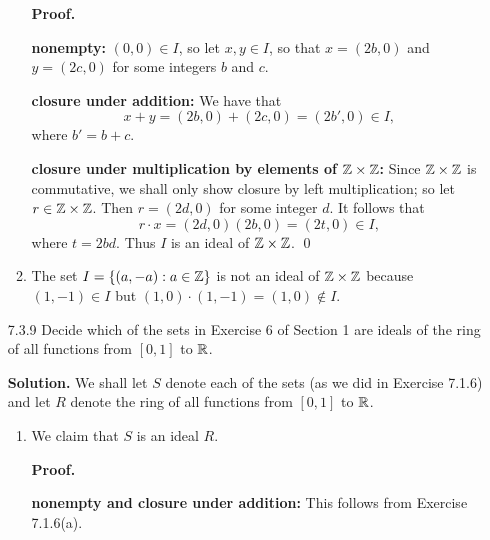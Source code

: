 \begin{enumerate}
\begin{enumerate}
               \textbf{Proof.}

               \textbf{nonempty:} $(0, 0) \in I$, so let $x, y \in I$, so that
               $x = (2b, 0)$ and $y = (2c, 0)$ for some integers $b$ and $c$.

               \textbf{closure under addition:} We have that
               $$x + y = (2b, 0) + (2c, 0) = (2b', 0) \in I,$$
               where $b' = b + c$.

               \textbf{closure under multiplication by elements of
               $\mathbb{Z}\times\mathbb{Z}$:} Since $\mathbb{Z}\times\mathbb{Z}$ is commutative, we shall only
               show closure by left multiplication; so let $r \in \mathbb{Z}\times\mathbb{Z}$.
               Then $r = (2d, 0)$ for some integer $d$. It follows that
               $$r\cdot x = (2d, 0)(2b, 0) = (2t, 0) \in I,$$
               where $t = 2bd$. Thus $I$ is an ideal of $\mathbb{Z}\times\mathbb{Z}$. \qed
         \item The set $I = \{(a, -a) : a \in \mathbb{Z}\}$ is not an ideal of
               $\mathbb{Z}\times\mathbb{Z}$ because $(1, -1) \in I$ but
               $(1, 0) \cdot (1, -1) = (1, 0) \notin I$.
      \end{enumerate}
   \item[7.3.9]   Decide which of the sets in Exercise 6 of Section 1 are ideals
                  of the ring of all functions from $[0, 1]$ to $\mathbb{R}$.

      \textbf{Solution.} We shall let $S$ denote each of the sets (as we did in
      Exercise 7.1.6) and let $R$ denote the ring of all functions from $[0, 1]$
      to $\mathbb{R}$.

      \begin{enumerate}
         \item We claim that $S$ is an ideal $R$.

               \textbf{Proof.}

               \textbf{nonempty and closure under addition:} This follows from 
               Exercise 7.1.6(a).


\end{enumerate}
\end{enumerate}
